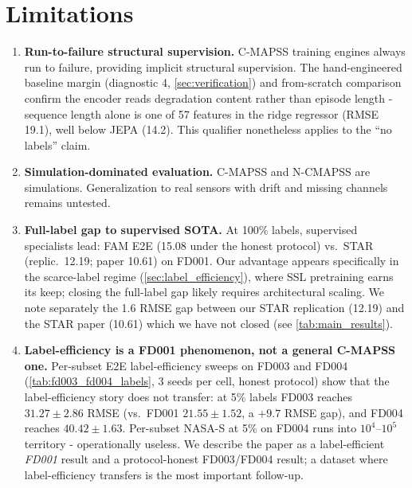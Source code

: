 \documentclass{article}
\begin{document}
\section{Limitations}
\label{sec:limitations}

\begin{enumerate}[nosep]
  \item \textbf{Run-to-failure structural supervision.} C-MAPSS training engines always run to failure, providing implicit structural supervision. The hand-engineered baseline margin (diagnostic 4, \cref{sec:verification}) and from-scratch comparison confirm the encoder reads degradation content rather than episode length - sequence length alone is one of 57 features in the ridge regressor (RMSE 19.1), well below JEPA (14.2). This qualifier nonetheless applies to the ``no labels'' claim.
  \item \textbf{Simulation-dominated evaluation.} C-MAPSS and N-CMAPSS are simulations. Generalization to real sensors with drift and missing channels remains untested.
  \item \textbf{Full-label gap to supervised SOTA.} At 100\% labels, supervised specialists lead: FAM E2E (15.08 under the honest protocol) vs.\ STAR (replic.\ 12.19; paper 10.61) on FD001. Our advantage appears specifically in the scarce-label regime (\cref{sec:label_efficiency}), where SSL pretraining earns its keep; closing the full-label gap likely requires architectural scaling. We note separately the 1.6 RMSE gap between our STAR replication (12.19) and the STAR paper (10.61) which we have not closed (see \cref{tab:main_results}).
  \item \textbf{Label-efficiency is a FD001 phenomenon, not a general C-MAPSS one.} Per-subset E2E label-efficiency sweeps on FD003 and FD004 (\cref{tab:fd003_fd004_labels}, 3 seeds per cell, honest protocol) show that the label-efficiency story does not transfer: at 5\% labels FD003 reaches $31.27 \pm 2.86$ RMSE (vs.\ FD001 $21.55 \pm 1.52$, a $+9.7$ RMSE gap), and FD004 reaches $40.42 \pm 1.63$. Per-subset NASA-S at 5\% on FD004 runs into $10^{4}$--$10^{5}$ territory - operationally useless. We describe the paper as a label-efficient \emph{FD001} result and a protocol-honest FD003/FD004 result; a dataset where label-efficiency transfers is the most important follow-up.


\end{enumerate}
\end{document}
